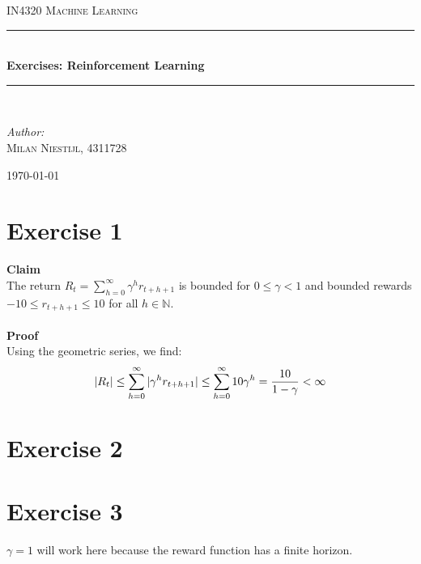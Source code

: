 \documentclass [a4paper] {report}
\begin{document}
	
	\begin{titlepage}
		\begin{center}
			
			\textsc{\LARGE IN4320 Machine Learning}\\[1.25cm]
			
			\rule{\linewidth}{0.5mm}\\[1.0cm]
			{\huge \bfseries Exercises: Reinforcement Learning }\\[0.6cm]
			\rule{\linewidth}{0.5mm}\\[1.5cm]
			
			\begin{minipage}{0.4\textwidth}
				\begin{flushleft} \large	
					\emph{Author:}\\
					\textsc{Milan Niestijl, 4311728}
				\end{flushleft}
			\end{minipage}
			
			\vfill
			{\large \today}
		\end{center}
	\end{titlepage}
	
	\section*{Exercise 1}
	\textbf{Claim}\\
	The return $R_{t} = \sum_{h=0}^{\infty}\gamma^{h}r_{t+h+1}$ is bounded for $0\leq \gamma<1$ and bounded rewards $-10\leq r_{t+h+1}\leq 10$ for all $h\in \mathbb{N}$.\\\\
	\textbf{Proof}\\
	Using the geometric series, we find:
	$$|R_{t}| \leq \sum_{h=0}^{\infty}|\gamma^{h}r_{t+h+1}| \leq \sum_{h=0}^{\infty}10 \gamma^{h} = {10 \over 1-\gamma} < \infty$$
	
	\section*{Exercise 2}
	
	\section*{Exercise 3}
	$\gamma=1$ will work here because the reward function has a finite horizon.
\end{document}
